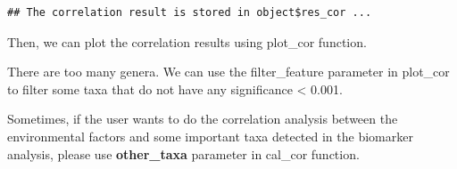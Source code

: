 \documentclass[
]{book}
\newenvironment{Shaded}{\begin{snugshade}}{\end{snugshade}}
\newcommand{\AttributeTok}[1]{\textcolor[rgb]{0.77,0.63,0.00}{#1}}
\newcommand{\CommentTok}[1]{\textcolor[rgb]{0.56,0.35,0.01}{\textit{#1}}}
\newcommand{\FunctionTok}[1]{\textcolor[rgb]{0.00,0.00,0.00}{#1}}
\newcommand{\NormalTok}[1]{#1}
\newcommand{\SpecialCharTok}[1]{\textcolor[rgb]{0.00,0.00,0.00}{#1}}
\newcommand{\StringTok}[1]{\textcolor[rgb]{0.31,0.60,0.02}{#1}}
\begin{document}
\begin{verbatim}
## The correlation result is stored in object$res_cor ...
\end{verbatim}

\begin{Shaded}
\end{Shaded}

Then, we can plot the correlation results using plot\_cor function.

\begin{Shaded}
\end{Shaded}

There are too many genera.
We can use the filter\_feature parameter in plot\_cor to filter some taxa that do not have any significance \textless{} 0.001.

\begin{Shaded}
\end{Shaded}

Sometimes, if the user wants to do the correlation analysis between the environmental factors and some important taxa detected in the biomarker analysis,
please use \textbf{other\_taxa} parameter in cal\_cor function.
\end{document}
